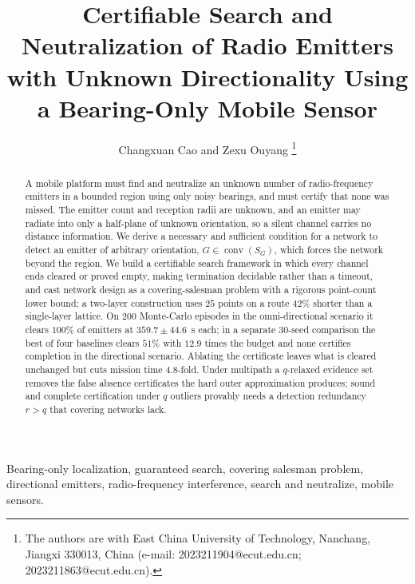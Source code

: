 \documentclass[journal,10pt]{IEEEtran}
\theoremstyle{definition}
\newcommand{\conv}{\operatorname{conv}}
\begin{document}
\title{Certifiable Search and Neutralization of Radio Emitters\\ with Unknown Directionality Using a Bearing-Only Mobile Sensor}

\author{Changxuan Cao and Zexu Ouyang%
\thanks{The authors are with East China University of Technology, Nanchang, Jiangxi 330013,
China (e-mail: 2023211904@ecut.edu.cn; 2023211863@ecut.edu.cn).}}

\maketitle

\begin{abstract}
A mobile platform must find and neutralize an unknown number of radio-frequency emitters in a
bounded region using only noisy bearings, and must certify that none was missed. The emitter count
and reception radii are unknown, and an emitter may radiate into only a half-plane of unknown
orientation, so a silent channel carries no distance information. We derive a necessary and
sufficient condition for a network to detect an emitter of arbitrary orientation,
$G\in\conv(S_G)$, which forces the network beyond the region. We build a certifiable search
framework in which every channel ends cleared or proved empty, making termination decidable rather
than a timeout, and cast network design as a covering-salesman problem with a rigorous point-count
lower bound; a two-layer construction uses $25$ points on a route $42\%$ shorter than a
single-layer lattice. On $200$ Monte-Carlo episodes in the omni-directional scenario it
clears $100\%$ of emitters at
$359.7\pm44.6$~s each; in a separate $30$-seed comparison the best of four baselines clears $51\%$
with $12.9$ times the budget and none certifies completion in the directional scenario. Ablating
the certificate leaves what is cleared unchanged but cuts mission time $4.8$-fold. Under multipath
a $q$-relaxed evidence set removes the false absence certificates the hard outer approximation
produces; sound and complete certification under $q$ outliers provably needs a detection redundancy
$r>q$ that covering networks lack.
\end{abstract}

\begin{IEEEkeywords}
Bearing-only localization, guaranteed search, covering salesman problem, directional emitters,
radio-frequency interference, search and neutralize, mobile sensors.
\end{IEEEkeywords}
\end{document}
